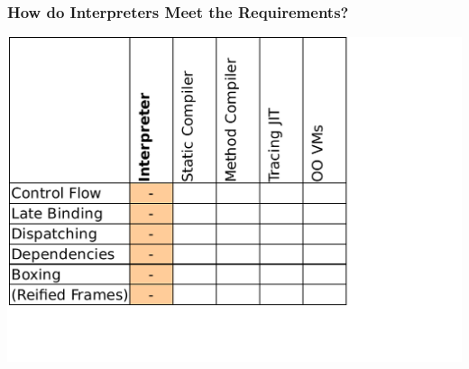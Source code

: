\documentclass[utf8x]{beamer}
\begin{document}
\begin{frame}
  \frametitle{How do Interpreters Meet the Requirements?}
  \includegraphics[scale=0.6]{figures/output1.pdf}
\end{frame}
\end{document}
